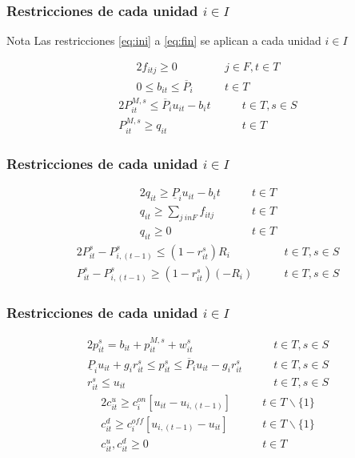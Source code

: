 \documentclass[xcolor=dvipsnames, utf8, spanish]{beamer} %
\begin{document}
\begin{frame}
	\frametitle{Restricciones de cada unidad $i \in I$}
	\begin{exampleblock} {Nota}
		Las restricciones \eqref{eq:ini} a \eqref{eq:fin} se aplican a cada unidad $i \in I$
	\end{exampleblock}
	\begin{alignat}{2}
		f_{itj}\geq 0 										&\qquad j \in F,t \in T \label{eq:ini} \\
		0 \leq b_{it} \leq \overline{P}_i 					&\qquad t \in T
	\end{alignat}
	\begin{alignat}{2}
		P^{M,s}_{it} \leq \overline{P}_i u_{it} - b_it		&\qquad t \in T, s \in S \\
		P^{M,s}_{it} \geq q_{it} 							&\qquad t \in T
	\end{alignat}
\end{frame}


\begin{frame}
	\frametitle{Restricciones de cada unidad $i \in I$}
	\begin{alignat}{2}
		q_{it} \geq \underline{P}_i u_{it} - b_it			&\qquad t \in T \\
		q_{it} \geq \sum_{j \ in F} f_{itj} 				&\qquad t \in T \\
		q_{it} \geq 0 										&\qquad t \in T	
	\end{alignat}
	\begin{alignat}{2}
		P^{s}_{it} - P^{s}_{i,(t-1)} \leq (1-r^{s}_{it})R_i &\qquad t \in T, s \in S \\
		P^{s}_{it} - P^{s}_{i,(t-1)} \geq (1-r^{s}_{it})(-R_i) &\qquad t \in T, s \in S
	\end{alignat}
\end{frame}

\begin{frame}
	\frametitle{Restricciones de cada unidad $i \in I$}
	\begin{alignat}{2}
		p^s_{it} = b_{it} + p^{M,s}_{it} + w^s_{it} 				&\qquad t \in T, s \in S \\
		\underline{P}_i u_{it}+ g_i r^s_{it} \leq p^s_{it} \leq \overline{P}_i u_{it} - g_i r^s_{it}	&\qquad t \in T, s \in S \\
		r^s_{it} \leq u_{it} 									&\qquad t \in T, s \in S
	\end{alignat}
	\begin{alignat}{2}
		c^u_{it} \geq c^{on}_i [u_{it}-u_{i,(t-1)}] 				&\qquad t \in T \backslash\{1\} \\
		c^d_{it} \geq c^{off}_i [u_{i,(t-1)}-u_{it}] 				&\qquad t \in T \backslash\{1\} \\
		c^u_{it} , c^d_{it} \geq 0									&\qquad t \in T	
	\end{alignat}
\end{frame}
\end{document}
